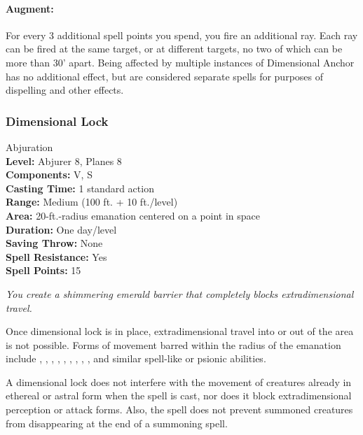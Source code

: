 \paragraph{Augment:} For every 3 additional spell points you spend, you fire an additional ray. Each ray can be fired at the same target, or at different targets, no two of which can be more than 30' apart. Being affected by multiple instances of Dimensional Anchor has no additional effect, but are considered separate spells for purposes of dispelling and other effects.
\subsubsection{Dimensional Lock}
\label{Spell:DimensionalLock}
Abjuration
\\ \textbf{Level:} Abjurer 8, Planes 8
\\ \textbf{Components:} V, S
\\ \textbf{Casting Time:} 1 standard action
\\ \textbf{Range:} Medium (100 ft. + 10 ft./level)
\\ \textbf{Area:} 20-ft.-radius emanation centered on a point in space
\\ \textbf{Duration:} One day/level
\\ \textbf{Saving Throw:} None
\\ \textbf{Spell Resistance:} Yes
\\ \textbf{Spell Points:} 15

\emph{You create a shimmering emerald barrier that completely blocks extradimensional travel. }

Once dimensional lock is in place, extradimensional travel into or out of the area is not possible. 
Forms of movement barred within the radius of the emanation include , , , , , , , , , and similar spell-like or psionic abilities.

A dimensional lock does not interfere with the movement of creatures already in ethereal or astral form when the spell is cast, 
nor does it block extradimensional perception or attack forms. 
Also, the spell does not prevent summoned creatures from disappearing at the end of a summoning spell.

